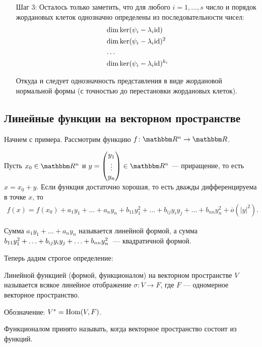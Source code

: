 \begin{itemize}
\item[Шаг 3:] Осталось только заметить, что для любого $i = 1, \ldots, s$  число и порядок жордановых клеток однозначно определены из последовательности чисел:
\begin{align*}
&\dim \ker (\psi_i - \lambda_i \mathrm{id}) \\
&\dim \ker (\psi_i - \lambda_i \mathrm{id}) ^ 2 \\
&\ldots \\
&\dim \ker (\psi_i - \lambda_i \mathrm{id})^{k_i}
\end{align*}

Откуда и следует однозначность представления в виде жордановой нормальной формы (с точностью до перестановки жордановых клеток).
\end{itemize}

\subsection*{Линейные функции на векторном пространстве}
Начнем с примера. Рассмотрим функцию $f \colon \R^n \rightarrow \R$.

Пусть $x_0 \in \R^n$ и $y = \begin{pmatrix}y_1 \\ \vdots \\ y_n\end{pmatrix} \in\R^n$ --- приращение, то есть $x = x_0 + y$. Если функция достаточно хорошая, то есть дважды дифференцируема в точке $x$, то
\begin{gather*}
f(x) = f(x_0) + a_1y_1 + \ldots + a_ny_n + b_{11}y_1^2 + \ldots + b_{ij}y_iy_j +\ldots + b_{nn}y_n^2 + \overline{o}(|y|^2).
\end{gather*}

Сумма $a_1y_1 + \ldots + a_ny_n$ называется линейной формой, а сумма $b_{11}y_1^2 + \ldots \hm+ b_{ij}y_iy_j + \ldots + b_{nn}y_n^2$~--- квадратичной формой.

Теперь дадим строгое определение:
\begin{Def}
Линейной функцией (формой, функционалом) на векторном пространстве $V$ называется всякое линейное отображение $\sigma \colon V \rightarrow F$, где $F$ --- одномерное векторное пространство. 

Обозначение: $V^* = \mathrm{Hom}(V, F)$.
\end{Def}

\begin{Comment}
Функционалом принято называть, когда векторное пространство состоит из функций.
\end{Comment}

